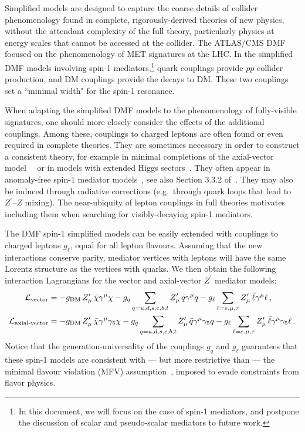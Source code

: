 \documentclass[a4paper, 11pt,notoc]{article}
\newcommand{\gDM}{\ensuremath{g_{\rm{DM}}}\xspace}
\newcommand{\gq}{\ensuremath{g_q}\xspace}
\begin{document}
Simplified models are designed to capture the coarse details of collider phenomenology found in complete, rigorously-derived theories of new physics, without the attendant complexity of the full theory, particularly physics at energy scales that cannot be accessed at the collider. The ATLAS/CMS DMF focused on the phenomenology of MET signatures at the LHC. In the simplified DMF models involving spin-1 mediators,\footnote{In this document, we will focus on the case of spin-1 mediators, and postpone the discussion of scalar and pseudo-scalar mediators to future work.} quark couplings provide $pp$ collider production, and DM couplings provide the decays to DM. These two couplings set a ``minimal width" for the spin-1 resonance. 

When adapting the simplified DMF models to the phenomenology of fully-visible signatures, one should more closely consider the effects of the additional%
couplings. Among these, couplings to charged leptons are often found or even required in complete theories. They are sometimes necessary in order to construct a consistent theory, for example in minimal completions of the axial-vector model~~\cite{Kahlhoefer:2015bea,Jacques:2016dqz} or in models with extended Higgs sectors~\cite{Arcadi:2013qia,Bauer:2016gys}. They often appear in anomaly-free spin-1 mediator models~\cite{Carena:2004xs}, see also Section 3.3.2 of~\cite{Boveia:2016mrp}. They may also be induced through radiative corrections (e.g.~through quark loops that lead to $Z^\prime$--$Z$ mixing). The near-ubiquity of lepton couplings in full theories motivates including them when searching for visibly-decaying spin-1 mediators.

The DMF spin-1 simplified models can be easily extended with couplings to charged leptons $g_\ell$, equal for all lepton flavours. Assuming that the new interactions conserve parity, mediator vertices with leptons will have the same Lorentz structure as the vertices with quarks. We then obtain the following interaction Lagrangians for the vector and axial-vector $Z^\prime$ mediator models:
\begin{align}
\label{eq:AV1}
\mathcal{L}_{\text{vector}} &=- \gDM \, Z^\prime_{\mu} \, \bar{\chi}\gamma^{\mu}\chi -   \gq  \sum_{q=u,d,s,c,b,t} Z^\prime_{\mu} \, \bar{q}\gamma^{\mu}q  - g_\ell  \sum_{\ell=e,\mu,\tau} Z^\prime_{\mu} \, \bar{\ell}\gamma^{\mu}\ell\,, \\
\label{eq:AV2} 
\mathcal{L}_{\text{axial-vector}}&=- \gDM \, Z^\prime_{\mu} \, \bar{\chi}\gamma^{\mu}\gamma_5\chi - \gq \sum_{q=u,d,s,c,b,t} Z^\prime_{\mu} \, \bar{q}\gamma^{\mu}\gamma_5q
-  g_\ell  \sum_{\ell=e,\mu,\tau} Z^\prime_{\mu} \, \bar{\ell}\gamma^{\mu}\gamma_5\ell\,.
\end{align}
Notice that the generation-universality of the couplings $\gq$ and $g_\ell$ guarantees that these spin-1 models are consistent with --- but more restrictive than --- the minimal flavour violation (MFV) assumption~\cite{D'Ambrosio:2002ex}, imposed to evade constraints from flavor physics. 
\end{document}
